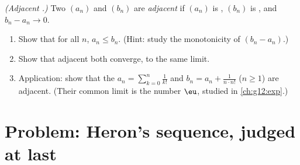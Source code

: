 \begin{exercise}[$\star\star\star$]\label{exo:g12:seq:10}
\emph{(Adjacent .)} Two  $(a_n)$ and $(b_n)$ are
\emph{adjacent} if $(a_n)$ is , $(b_n)$ is , and
$b_n - a_n \to 0$.
\begin{enumerate}
  \item Show that for all $n$, $a_n \leq b_n$. (Hint: study the monotonicity
        of $(b_n - a_n)$.)
  \item Show that adjacent  both converge, to the same limit.
  \item Application: show that the 
        $a_n = \sum_{k=0}^{n} \frac{1}{k!}$ and
        $b_n = a_n + \frac{1}{n \cdot n!}$ ($n \geq 1$) are adjacent. (Their
        common limit is the number $\eu$, studied in \cref{ch:g12:exp}.)
\end{enumerate}
\end{exercise}

\section{Problem: Heron's sequence, judged at last}

